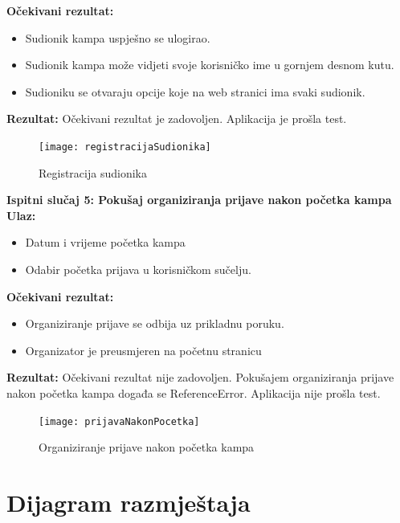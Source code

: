 			\textbf{Očekivani rezultat:}
				\begin{itemize}
					\item {Sudionik kampa uspješno se ulogirao.}
					\item {Sudionik kampa može vidjeti svoje korisničko ime u gornjem desnom kutu.}
					\item {Sudioniku se otvaraju opcije koje na web stranici ima svaki sudionik.}
				\end{itemize}
			
			{\textbf{Rezultat:} Očekivani rezultat je zadovoljen. Aplikacija je prošla test.\\}
			
			\begin{figure}[h]
				\centering
				\texttt{[image: registracijaSudionika]}
				\caption{Registracija sudionika}
			\end{figure}
			
			\clearpage
			
			\textbf{Ispitni slučaj 5: Pokušaj organiziranja prijave nakon početka kampa\\}
			\indent\textbf{Ulaz:}
			\begin{itemize}
				\item {Datum i vrijeme početka kampa}
				\item {Odabir početka prijava u korisničkom sučelju.}
			\end{itemize}
			
			\textbf{Očekivani rezultat:}
			\begin{itemize}
				\item {Organiziranje prijave se odbija uz prikladnu poruku.}
				\item {Organizator je preusmjeren na početnu stranicu}
			\end{itemize}
			
			{\textbf{Rezultat:} Očekivani rezultat nije zadovoljen. Pokušajem organiziranja prijave nakon početka kampa događa se ReferenceError. Aplikacija nije prošla test.\\}
			
			\begin{figure}[h]
				\centering
				\texttt{[image: prijavaNakonPocetka]}
				\caption{Organiziranje prijave nakon početka kampa}
			\end{figure}

			
			\eject 
		
		
		\section{Dijagram razmještaja}
			
